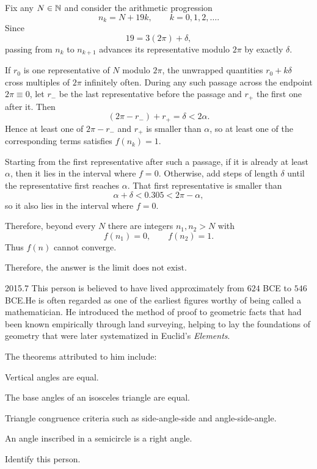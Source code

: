 \begin{solutions}
\begin{solution}
            Fix any $N\in\mathbb{N}$ and consider the arithmetic progression
            \[
                n_k=N+19k,
                \qquad k=0,1,2,\dots.
            \]
            Since
            \[
                19=3(2\pi)+\delta,
            \]
            passing from $n_k$ to $n_{k+1}$ advances its representative modulo
            $2\pi$ by exactly $\delta$.

            If $r_0$ is one representative of $N$ modulo $2\pi$, the unwrapped
            quantities $r_0+k\delta$ cross multiples of $2\pi$ infinitely often.
            During any such passage across the endpoint $2\pi\equiv0$, let $r_-$ be
            the last representative before the passage and $r_+$ the first one after it.
            Then
            \[
                (2\pi-r_-)+r_+=\delta<2\alpha.
            \]
            Hence at least one of $2\pi-r_-$ and $r_+$ is smaller than $\alpha$,
            so at least one of the corresponding terms satisfies $f(n_k)=1$.

            Starting from the first representative after such a passage, if it is
            already at least $\alpha$, then it lies in the interval where $f=0$.
            Otherwise, add steps of length $\delta$ until the representative first
            reaches $\alpha$. That first representative is smaller than
            \[
                \alpha+\delta<0.305<2\pi-\alpha,
            \]
            so it also lies in the interval where $f=0$.

            Therefore, beyond every $N$ there are integers $n_1,n_2>N$ with
            \[
                f(n_1)=0,
                \qquad
                f(n_2)=1.
            \]
            Thus $f(n)$ cannot converge.

            Therefore, the answer is $\boxed{\text{the limit does not exist}}$.
        \end{solution}
    \end{solutions}

    \begin{pastproblem}{2015.7}
        This person is believed to have lived approximately from $624$ BCE to $546$ BCE.\@ He is
        often regarded as one of the earliest figures worthy of being called a mathematician. He
        introduced the method of proof to geometric facts that had been known empirically through
        land surveying, helping to lay the foundations of geometry that were later systematized in
        Euclid's \textit{Elements}.

        The theorems attributed to him include:
        \begin{problemchoices}
            \item Vertical angles are equal.
            \item The base angles of an isosceles triangle are equal.
            \item Triangle congruence criteria such as side-angle-side and angle-side-angle.
            \item An angle inscribed in a semicircle is a right angle.
        \end{problemchoices}
        Identify this person.
    \end{pastproblem}

